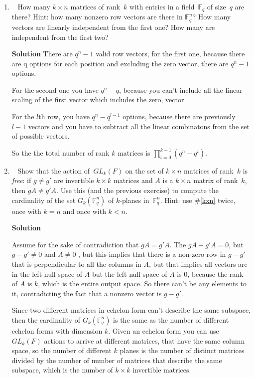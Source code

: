 \documentclass[11pt]{article}
\newcommand\score[1]{\marginpar{\vspace{-2ex}\color{blue}{#1/3}}\hspace{-1ex}}
\newcommand\0{\mathbf{0}}
\newcommand\FF{\mathbb{F}}
\newcommand\GL{\mathit{GL}}
\newcommand\<{\langle}
\renewcommand\>{\rangle}
\begin{document}
\begin{enumerate}
Since all points that have open balls around them can't achieve minimum angle, and only points on
the extreme ray don't have open balls, the unit vector $x$ has to be on an extreme ray, to achieve
minimum.

\pagebreak


\item\ \score{3}\label{kxn}%
How many $k \times n$ matrices of rank~$k$ with entries in a
field~$\FF_q$ of size~$q$ are there?  Hint: how many nonzero row
vectors are there in $\FF_q^n$?  How many vectors are linearly
independent from the first one?  How many are independent from the
first two?

\textbf{Solution}
There are $q^n-1$ valid row vectors, for the first one, because there are q options for each position
and excluding the zero vector, there are $q^n-1$ options.

For the second one you have $q^n-q$, because you can't include all the linear scaling of the first vector
which includes the zero, vector. 

For the $l$th row, you have $q^n - q^{l-1}$ options, because there are previously $l-1$ vectors
and you have to subtract all the linear combinatons from the set of possible vectors.

So the the total number of rank $k$ matrices is $\prod_{i=0}^{k-1} (q^n - q^i)$.

\pagebreak


\item\ \score{3}\label{free}%
Show that the action of~$\GL_k(F)$ on the set of $k \times n$ matrices
of rank~$k$ is \emph{free}: if $g \neq g'$ are invertible $k \times k$
matrices and $A$ is a $k \times n$ matrix of rank~$k$, then $gA \neq
g'A$.  Use this (and the previous exercise) to compute the cardinality
of the set $G_k(\FF_q^n)$ of $k$-planes in~$\FF_q^n$.  Hint: use
\#\ref{kxn} twice, once with $k = n$ and once with $k < n$.

\textbf{Solution}

Assume for the sake of contradiction that $gA=g'A$. The $gA-g'A=0$, but $g-g' \neq 0$ and $A\neq 0$
, but this implies that there is a non-zero row in $g-g'$ that is perpendicular to all 
the columns in $A$, but that implies all vectors are in the left null space of $A$
but the left null space of $A$ is 0, because the rank of $A$ is $k$, which is the entire output space.
So there can't be any elements to it, contradicting the fact that a nonzero vector is $g-g'$.

Since two different matrices in echelon form can't describe the same subspace, then the cardinality of
$G_k(\FF_q^n)$ is the same as the number of different echelon forms with dimension $k$. Given an echelon form you
can use $GL_k(F)$ actions to arrive at different matrices, that have the same column space, so 
the number of different $k$ planes is the number of distinct matrices divided by the number of 
number of matrices that describe the same subspace, which is the number of $k \times k$ invertible matrices.


\end{enumerate}
\end{document}
